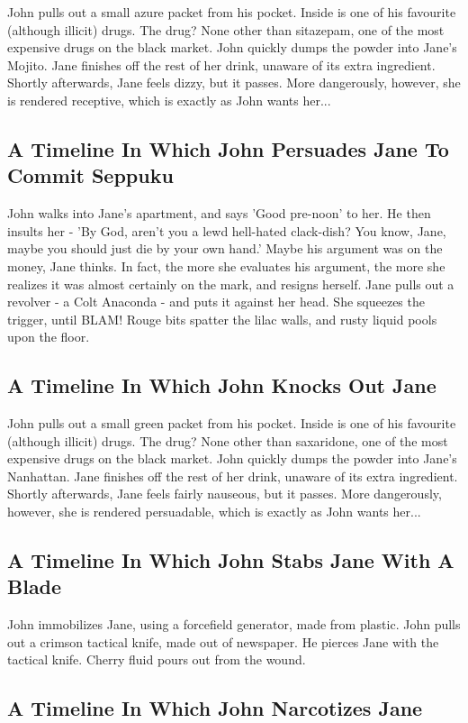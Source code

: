 \documentclass{article}
\begin{document}
John pulls out a small azure packet from his pocket. Inside is one of his favourite (although illicit) drugs.
The drug? None other than sitazepam, one of the most expensive drugs on the black market.
John quickly dumps the powder into Jane's Mojito.
Jane finishes off the rest of her drink, unaware of its extra ingredient.
Shortly afterwards, Jane feels dizzy, but it passes.
More dangerously, however, she is rendered receptive, which is exactly as John wants her...
\subsection{A Timeline In Which John Persuades Jane To Commit Seppuku}


John walks into Jane's apartment, and says 'Good pre{-}noon' to her.
He then insults her {-} 'By God, aren't you a lewd hell{-}hated clack{-}dish?
You know, Jane, maybe you should just die by your own hand.'
Maybe his argument was on the money, Jane thinks.
In fact, the more she evaluates his argument, the more she realizes it was almost certainly on the mark, and resigns herself.
Jane pulls out a revolver {-} a Colt Anaconda {-} and puts it against her head.
She squeezes the trigger, until BLAM!
Rouge bits spatter the lilac walls, and rusty liquid pools upon the floor.
\subsection{A Timeline In Which John Knocks Out Jane}


John pulls out a small green packet from his pocket. Inside is one of his favourite (although illicit) drugs.
The drug? None other than saxaridone, one of the most expensive drugs on the black market.
John quickly dumps the powder into Jane's Nanhattan.
Jane finishes off the rest of her drink, unaware of its extra ingredient.
Shortly afterwards, Jane feels fairly nauseous, but it passes.
More dangerously, however, she is rendered persuadable, which is exactly as John wants her...
\subsection{A Timeline In Which John Stabs Jane With A Blade}


John immobilizes Jane, using a forcefield generator, made from plastic.
John pulls out a crimson tactical knife, made out of newspaper.
He pierces Jane with the tactical knife.
Cherry fluid pours out from the wound.
\subsection{A Timeline In Which John Narcotizes Jane}
\end{document}
